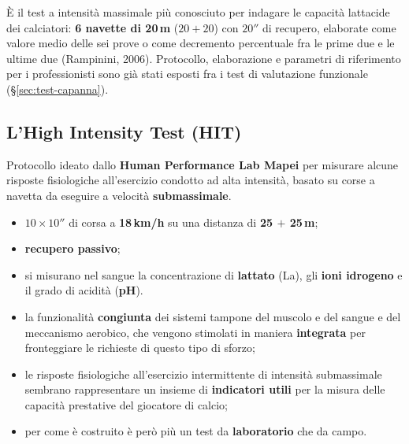 È il test a intensità massimale più conosciuto per indagare le capacità lattacide dei calciatori:
\textbf{6 navette di 20\,m} ($20 + 20$) con $20''$ di recupero, elaborate come valore medio delle sei
prove o come decremento percentuale fra le prime due e le ultime due (Rampinini, 2006). Protocollo,
elaborazione e parametri di riferimento per i professionisti sono già stati esposti fra i test di
valutazione funzionale (§\ref{sec:test-capanna}).

\subsection{L'High Intensity Test (HIT)}

Protocollo ideato dallo \textbf{Human Performance Lab Mapei} per misurare alcune risposte
fisiologiche all'esercizio condotto ad alta intensità, basato su corse a navetta da eseguire a
velocità \textbf{submassimale}.

\begin{itemize}
  \item $10 \times 10''$ di corsa a \textbf{18\,km/h} su una distanza di \textbf{25 $+$ 25\,m};
  \item \textbf{recupero passivo};
  \item si misurano nel sangue la concentrazione di \textbf{lattato} (La), gli \textbf{ioni
    idrogeno} e il grado di acidità (\textbf{pH}).
\end{itemize}

\begin{itemize}
  \item la funzionalità \textbf{congiunta} dei sistemi tampone del muscolo e del sangue e del
    meccanismo aerobico, che vengono stimolati in maniera \textbf{integrata} per fronteggiare le
    richieste di questo tipo di sforzo;
  \item le risposte fisiologiche all'esercizio intermittente di intensità submassimale sembrano
    rappresentare un insieme di \textbf{indicatori utili} per la misura delle capacità prestative del
    giocatore di calcio;
  \item per come è costruito è però più un test da \textbf{laboratorio} che da campo.
\end{itemize}
